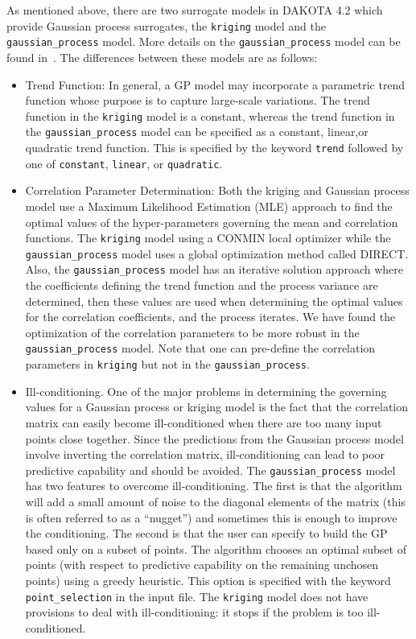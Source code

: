 As mentioned above, there are two surrogate models in DAKOTA 4.2 
which provide Gaussian process surrogates, the \texttt{kriging} 
model and the \texttt{gaussian\_process} model.  More details on 
the \texttt{gaussian\_process} model can be found in~\cite{McF08}. 
The differences between these models are as follows: 

\begin{itemize}

\item Trend Function:  In general, a GP model may incorporate a parametric
trend function whose purpose is to capture large-scale variations. 
The trend function in the \texttt{kriging} model is a constant, 
whereas the trend function in the \texttt{gaussian\_process} model 
can be specified as a constant, linear,or quadratic trend function.  
This is specified by the keyword \texttt{trend}
followed by one of \texttt{constant}, \texttt{linear}, or \texttt{quadratic}.

\item Correlation Parameter Determination: Both the kriging and 
Gaussian process model use a Maximum Likelihood Estimation (MLE) approach 
to find the optimal values of the hyper-parameters governing the 
mean and correlation functions. The \texttt{kriging} model using a 
CONMIN local optimizer while the \texttt{gaussian\_process} model uses 
a global optimization method called DIRECT.
Also, the \texttt{gaussian\_process} model has an iterative solution approach
where the coefficients defining the trend function and the process variance
are determined, then these values are used when determining the optimal values
for the correlation coefficients, and the process iterates.  
We have found the optimization of the
correlation parameters to be more robust in the \texttt{gaussian\_process}
model. Note that one can pre-define the correlation parameters in 
\texttt{kriging} but not in the \texttt{gaussian\_process}.  

\item Ill-conditioning.  One of the major problems in determining 
the governing values for a Gaussian process or kriging model is the fact 
that the correlation matrix can easily become ill-conditioned when there 
are too many input points close together.  Since the predictions from 
the Gaussian process model involve inverting the correlation matrix, 
ill-conditioning can lead to poor predictive capability and should be avoided. 
The \texttt{gaussian\_process} model has two features to overcome
ill-conditioning.  The first is that the algorithm will add a small amount 
of noise to the diagonal elements of the matrix (this is often referred to 
as a ``nugget'') and sometimes this is enough to improve the conditioning. 
The second is that the user can specify to build the GP based only on a subset 
of points.  The algorithm chooses an optimal subset of points (with 
respect to predictive capability on the remaining unchosen points) using a 
greedy heuristic. This option is specified with the keyword 
\texttt{point\_selection} in the input file.  
The \texttt{kriging} model does not have provisions 
to deal with ill-conditioning:  it stops if the problem is too ill-conditioned.

\end{itemize}

